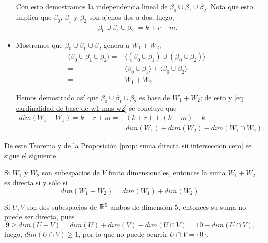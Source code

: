 \begin{itemize}
	Con esto demostramos la independencia lineal de 
	$\beta_{0} \cup \beta_{1} \cup \beta_{2}$. Nota que esto
	implica que $\beta_{0}$, $\beta_{1}$ y
	$\beta_{2}$ son ajenos dos a dos, luego,
	\begin{equation}
		\label{eq: cardinalidad de base de w1 mas w2}
		|\beta_{0} \cup \beta_{1} \cup \beta_{2}| = k + r + m.
	\end{equation}
	
	\item Mostremos que
	 $\beta_{0} \cup \beta_{1} \cup \beta_{2}$
	genera a $W_{1} + W_{2}$;
	\begin{align*}
	\langle \beta_{0} \cup \beta_{1} \cup \beta_{2} \rangle
	= & \langle
	( \beta_{0} \cup \beta_{1} ) \cup 
	( \beta_{0} \cup \beta_{2} )
	\rangle \\
	= & \langle  \beta_{0} \cup \beta_{1}  \rangle + 
	\langle  \beta_{0} \cup \beta_{2} \rangle \\
	= & W_{1} + W_{2}. 
	\end{align*}
	
	Hemos demostrado así que 
	$\beta_{0} \cup \beta_{1} \cup \beta_{2}$
	es base de $W_{1} + W_{2}$; de esto y 
	\eqref{eq: cardinalidad de base de w1 mas w2}
	se concluye que 
	\begin{align*}
	dim(W_{1} + W_{1}) = k + r + m = &
	(k+r) + (k+m) - k \\
	= & dim(W_{1}) + dim(W_{2}) - dim(W_{1} \cap W_{2}).
	\end{align*}
\end{itemize}
\QEDB
\vspace{0.2cm}

De este Teorema y de la Proposición 
\ref{prop: suma directa sii interseccion cero}
se sigue el siguiente

\begin{cor}
Si $W_{1}$ y $W_{2}$ son subespacios de $V$ finito dimensionales,
entonces la suma $W_{1} + W_{2}$ es directa si y sólo si 
\[
dim(W_{1} + W_{2}) = dim(W_{1}) + dim(W_{2}).
\]
\end{cor}


\begin{ejem}
Si $U, V$ son dos subespacios de $\mathbb{R}^{9}$ ambos de dimensión $5$,
entonces su suma no puede ser directa, pues
\[
9 \geq dim(U + V) = dim(U) + dim(V) - dim(U \cap V) = 10 - dim(U \cap V),
\]
luego, $dim(U \cap V) \geq 1$, por lo que no puede ocurrir
$U \cap V = \{ 0 \}$.
\end{ejem}

